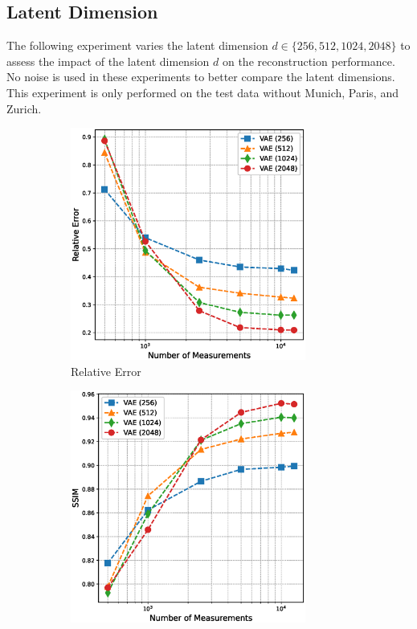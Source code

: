 \subsection{Latent Dimension}\label{subsection:latent_dimension}
The following experiment varies the latent dimension $d \in \{256, 512, 1024, 2048\}$ to assess the impact of the latent dimension $d$ on the reconstruction performance.
No noise is used in these experiments to better compare the latent dimensions.
This experiment is only performed on the test data without Munich, Paris, and Zurich.
\begin{figure}[h!]
    \centering
    \begin{subfigure}[b]{0.49\textwidth}
        \centering
        \includegraphics[width=0.85\textwidth]{figures/06_results/vae_benchmark/effect_of_latent_dimension/effect_of_latent_dimension_relative_error.eps}
        \caption{Relative Error}
    \end{subfigure}
    \begin{subfigure}[b]{0.49\textwidth}
        \centering
        \includegraphics[width=0.85\textwidth]{figures/06_results/vae_benchmark/effect_of_latent_dimension/effect_of_latent_dimension_ssim.eps}

\end{subfigure}
\end{figure}
